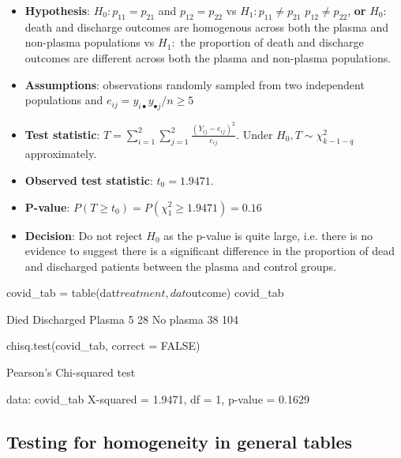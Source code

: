 \documentclass[a4paper]{article}\usepackage[]{graphicx}\usepackage[]{xcolor}
\begin{document}
\begin{itemize}
	\item \textbf{Hypothesis}: \( H_0: p_{11} = p_{21} \) and \( p_{12} = p_{22} \) vs \( H_1: p_{11} \neq p_{21} \) \( p_{12} \neq p_{22} \), \textbf{or} \( H_0: \)  death and discharge outcomes are homogenous across both the plasma and non-plasma populations vs \( H_1: \) the proportion of death and discharge outcomes are different across both the plasma and non-plasma populations.
	\item \textbf{Assumptions}: observations randomly sampled from two independent populations and \( e_{ij} =y_{i \bullet} y_{\bullet j}/n \geq 5 \)
	\item \textbf{Test statistic}: \( T = \sum\limits_{i=1}^{2}\sum\limits_{j=1}^{2} \frac{(Y_{ij} - e_{ij})^2}{e_{ij}} \). Under \( H_0, T \sim \chi^2_{k-1-q} \) approximately.
	\item \textbf{Observed test statistic}: \( t_0 = 1.9471 \).
	\item \textbf{P-value}: \( P(T\geq t_0) = P(\chi^2_1 \geq 1.9471) = 0.16 \)
	\item \textbf{Decision}: Do not reject \( H_0 \) as the p-value is quite large, i.e. there is no evidence to suggest there is a significant difference in the proportion of dead and discharged patients between the plasma and control groups.
\end{itemize}
\begin{Schunk}
\begin{Sinput}
covid_tab = table(dat$treatment, dat$outcome)
covid_tab
\end{Sinput}
\begin{Soutput}
           
            Died Discharged
  Plasma       5         28
  No plasma   38        104
\end{Soutput}
\begin{Sinput}
chisq.test(covid_tab, correct = FALSE)
\end{Sinput}
\begin{Soutput}

	Pearson's Chi-squared test

data:  covid_tab
X-squared = 1.9471, df = 1, p-value = 0.1629
\end{Soutput}
\end{Schunk}
\subsection{Testing for homogeneity in general tables}
\end{document}
